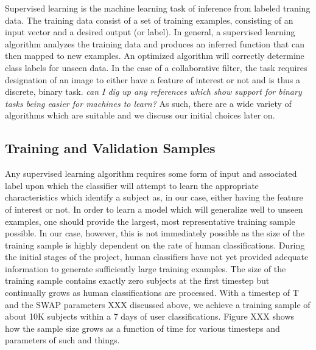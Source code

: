 \documentclass[twocolumn]{aastex6}
\begin{document}
Supervised learning is the machine learning task of inference from labeled traning data. The training data consist of a set of training examples, consisting of an input vector and a desired output (or label).  In general, a supervised learning algorithm analyzes the training data and produces an inferred function that can then mapped to new examples. An optimized algorithm will correctly determine class labels for unseen data. In the case of a collaborative filter, the task requires designation of an image to either have a feature of interest or not and is thus a discrete, binary task.  \textit{can I dig up any references which show support for binary tasks being easier for machines to learn?} As such, there are a wide variety of algorithms which are suitable and we discuss our initial choices later on. 

\subsection{Training and Validation Samples}

Any supervised learning algorithm requires some form of input and associated label upon which the classifier will attempt to learn the appropriate characteristics which identify a subject as, in our case, either having the feature of interest or not.  In order to learn a model which will generalize well to unseen examples, one should provide the largest, most representative training sample possible. In our case, however, this is not immediately possible as the size of the training sample is highly dependent on the rate of human classifications. During the initial stages of the project, human classifiers have not yet provided adequate information to generate sufficiently large training examples.  The size of the training sample contains exactly zero subjects at the first timestep but continually grows as human classifications are processed. With a timestep of T and the SWAP parameters XXX discussed above, we achieve a training sample of about 10K subjects within a 7 days of user classifications. Figure XXX shows how the sample size grows as a function of time for various timesteps and parameters of such and things. 



 
\end{document}
